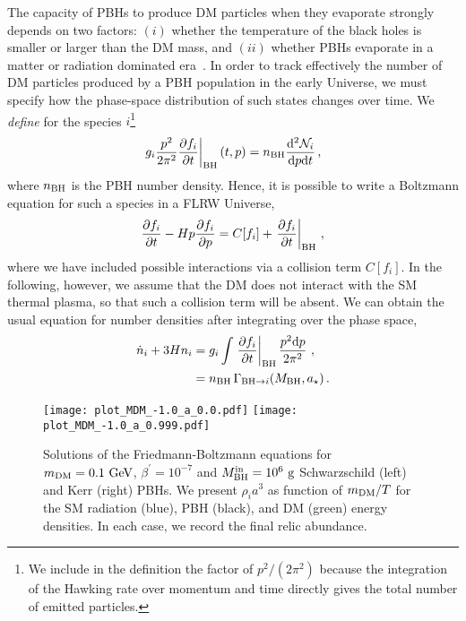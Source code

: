 \documentclass[aps,prd,reprint,twocolumn,preprintnumbers,floatfix,nofootinbib]{revtex4-1}
\newcommand{\mDM}{m_{\rm DM}}
\newcommand{\MBH}{M_{\rm BH}}
\newcommand{\MBHi}{M_{\rm BH}^{\rm in}}
\newcommand{\bh}{{\rm BH}}
\newcommand{\as}{a_\star}
\newcommand{\GeV}{\rm GeV}
\newcommand{\g}{\rm g}
\begin{document}
The capacity of PBHs to produce DM particles when they evaporate strongly depends on two factors: $(i)$ whether the temperature of the black holes is smaller or larger than the DM mass, and $(ii)$ whether PBHs evaporate in a matter or radiation dominated era~\cite{Lennon:2017tqq, Morrison:2018xla, Hooper:2019gtx, Gondolo:2020uqv, Masina:2020xhk,  Bernal:2020bjf, Bernal:2020ili, Masina:2021zpu}. In order to track effectively the number of DM particles produced by a PBH population in the early Universe, we must specify how the phase-space distribution of such states changes over time. We \emph{define} for the species $i$\footnote{We include in the definition the factor of $p^2/(2\pi^2)$ because the integration of the Hawking rate over momentum and time directly gives the total number of emitted particles.}
\begin{align}
\left.g_i\frac{p^2}{2\pi^2}\frac{\partial f_i}{\partial t}\right|_\bh(t,p)=n_\bh \frac{\dd^2 \mathcal{N}_{i}}{\dd p\dd t}\,,
\end{align}
where $n_\bh$ is the PBH number density. Hence, it is possible to write a Boltzmann equation for such a species in a FLRW Universe,
\begin{align}
\frac{\partial f_i}{\partial t}-Hp\frac{\partial f_i}{\partial p}=C[f_i]+\left.\frac{\partial f_{i}}{\partial t}\right|_\bh\,,
\end{align}
where we have included possible interactions via a collision term $C[f_i]$. In the following, however, we assume that the DM does not interact with the SM thermal plasma, so that such a collision term will be absent. We can obtain the usual equation for number densities after integrating over the phase space,
\begin{align}\label{eq:NumEq}
\dot{n}_{i} + 3H n_{i} &=  g_i\int\left.\frac{\partial f_{i}}{\partial t}\right|_\bh\frac{p^2\dd p}{2\pi^2}\,\notag\,,\\
&=n_\bh\, \Gamma_{{\rm BH} \to i}(\MBH,\as)\,.
\end{align}
\begin{figure*}[t!]
 \centering
 \texttt{[image: plot\_MDM\_-1.0\_a\_0.0.pdf]}
 \texttt{[image: plot\_MDM\_-1.0\_a\_0.999.pdf]}
 \caption{\footnotesize\label{fig:sol} Solutions of the Friedmann-Boltzmann equations for $\mDM = 0.1~\GeV$, $\beta^\prime = 10^{-7}$ and $\MBHi = 10^6~\g$ Schwarzschild (left) and Kerr (right) PBHs. We present $\rho_i a^3$ as function of $\mDM/T$ for the SM radiation (blue), PBH (black), and DM (green) energy densities. In each case, we record the final relic abundance. }
\end{figure*}
\end{document}

